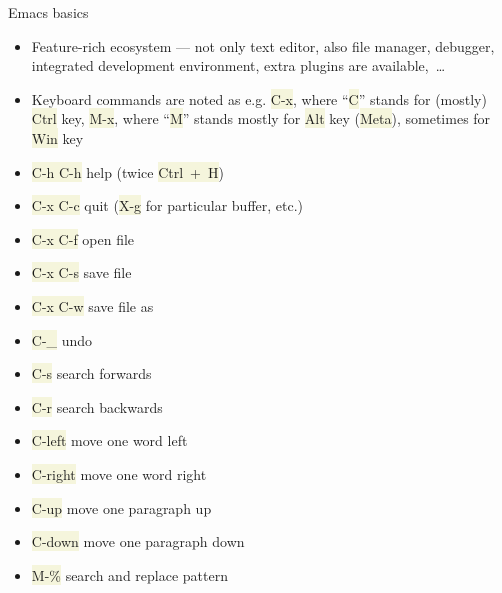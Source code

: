 \documentclass[compress, xelatex, 11pt, xcolor=svgnames, aspectratio=169,
	hyperref={
		bookmarks=true,
		unicode=true,
		colorlinks=true,
		pdftitle={Linux, command line and MetaCentrum},
		plainpages=false,
		pdfauthor={Vojtech Zeisek},
		pdfsubject={Course about use of Linux command line, writing shell scripts and using MetaCentrum of CESNET},
		pdfcreator={XeLaTeX},
		pdfkeywords={Linux, GNU, BASH, shell, command line, MetaCentrum},
		linkcolor=DarkRed, %
		anchorcolor=DarkBlue, %
		citecolor=Indigo, %
		filecolor=NavyBlue, %
		menucolor=DarkMagenta, %
		urlcolor=DarkBlue, %
		},
	url={hyphens, lowtilde} %
	]{beamer}
\renewcommand{\texttt}[1]{\colorbox{Beige}{{\ttfamily #1}}}
\begin{document}
\begin{frame}{Emacs basics}
	\begin{itemize}
		\item Feature-rich ecosystem --- not only text editor, also file manager, debugger, integrated development environment, extra plugins are available,~\ldots
		\item Keyboard commands are noted as e.g. \texttt{C-x}, where \enquote{\texttt{C}} stands for (mostly) \texttt{Ctrl} key, \texttt{M-x}, where \enquote{\texttt{M}} stands mostly for \texttt{Alt} key (\texttt{Meta}), sometimes for \texttt{Win} key
	\end{itemize}
	\begin{multicols}{2}
		\begin{itemize}
			\item \texttt{C-h C-h} help (twice \texttt{Ctrl~+~H})
			\item \texttt{C-x C-c} quit (\texttt{X-g} for particular buffer, etc.)
			\item \texttt{C-x C-f} open file
			\item \texttt{C-x C-s} save file
			\item \texttt{C-x C-w} save file as
			\item \texttt{C-\_} undo
			\item \texttt{C-s} search forwards
			\item \texttt{C-r} search backwards
			\item \texttt{C-left} move one word left
			\item \texttt{C-right} move one word right
			\item \texttt{C-up} move one paragraph up
			\item \texttt{C-down} move one paragraph down
			\item \texttt{M-\%} search and replace pattern
		\end{itemize}
	\end{multicols}
\end{frame}
\end{document}
